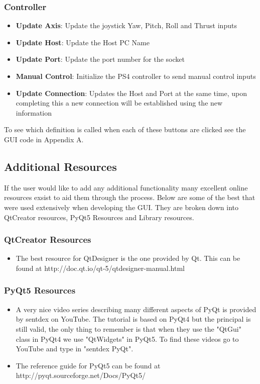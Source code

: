 \subsubsection{Controller}
\begin{itemize}
	\item \textbf{Update Axis}: Update the joystick Yaw, Pitch, Roll and Thrust inputs
	\item \textbf{Update Host}: Update the Host PC Name
	\item \textbf{Update Port}: Update the port number for the socket
	\item \textbf{Manual Control}: Initialize the PS4 controller to send manual control inputs
	\item \textbf{Update Connection}: Updates the Host and Port at the same time, upon completing this a new connection will be established using the new information
\end{itemize}
To see which definition is called when each of these buttons are clicked see the GUI code in Appendix A.  
\subsection{Additional Resources}
If the user would like to add any additional functionality many excellent online resources exsist to aid them through the process. Below are some of the best that were used extensively when developing the GUI. They are broken down into QtCreator resources, PyQt5 Resources and Library resources. 

\subsubsection{QtCreator Resources}
\begin{itemize}
	\item The best resource for QtDesigner is the one provided by Qt. This can be found at http://doc.qt.io/qt-5/qtdesigner-manual.html
\end{itemize}
\subsubsection{PyQt5 Resources}
\begin{itemize}
	\item A very nice video series describing many different aspects of PyQt is provided by sentdex on YouTube. The tutorial is based on PyQt4 but the principal is still valid, the only thing to remember is that when they use the "QtGui" class in PyQt4 we use "QtWidgets" in PyQt5. To find these videos go to YouTube and type in "sentdex PyQt".
	\item The reference guide for PyQt5 can be found at http://pyqt.sourceforge.net/Docs/PyQt5/
\end{itemize}
